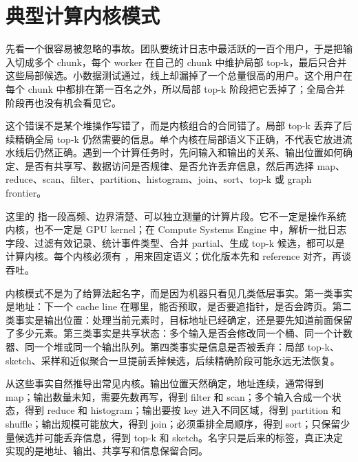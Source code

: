 \chapter{典型计算内核模式}

先看一个很容易被忽略的事故。团队要统计日志中最活跃的一百个用户，于是把输入切成多个 chunk，每个 worker 在自己的 chunk 中维护局部 top-k，最后只合并这些局部候选。小数据测试通过，线上却漏掉了一个总量很高的用户。这个用户在每个 chunk 中都排在第一百名之外，所以局部 top-k 阶段把它丢掉了；全局合并阶段再也没有机会看见它。

这个错误不是某个堆操作写错了，而是内核组合的合同错了。局部 top-k 丢弃了后续精确全局 top-k 仍然需要的信息。单个内核在局部语义下正确，不代表它放进流水线后仍然正确。遇到一个计算任务时，先问输入和输出的关系、输出位置如何确定、是否有共享写、数据访问是否规律、是否允许丢弃信息，然后再选择 map、reduce、scan、filter、partition、histogram、join、sort、top-k 或 graph frontier。

这里的  指一段高频、边界清楚、可以独立测量的计算片段。它不一定是操作系统内核，也不一定是 GPU kernel；在 Compute Systems Engine 中，解析一批日志字段、过滤有效记录、统计事件类型、合并 partial、生成 top-k 候选，都可以是计算内核。每个内核必须有 ，用来固定语义；优化版本先和 reference 对齐，再谈吞吐。

内核模式不是为了给算法起名字，而是因为机器只看见几类低层事实。第一类事实是地址：下一个 cache line 在哪里，能否预取，是否要追指针，是否会跨页。第二类事实是输出位置：处理当前元素时，目标地址已经确定，还是要先知道前面保留了多少元素。第三类事实是共享状态：多个输入是否会修改同一个桶、同一个计数器、同一个堆或同一个输出队列。第四类事实是信息是否被丢弃：局部 top-k、sketch、采样和近似聚合一旦提前丢掉候选，后续精确阶段可能永远无法恢复。

从这些事实自然推导出常见内核。输出位置天然确定，地址连续，通常得到 map；输出数量未知，需要先数再写，得到 filter 和 scan；多个输入合成一个状态，得到 reduce 和 histogram；输出要按 key 进入不同区域，得到 partition 和 shuffle；输出规模可能放大，得到 join；必须重排全局顺序，得到 sort；只保留少量候选并可能丢弃信息，得到 top-k 和 sketch。名字只是后来的标签，真正决定实现的是地址、输出、共享写和信息保留合同。

